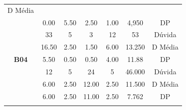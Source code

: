 \begin{table}[htbp]
\begin{tabular}{|ccccccc|}
		D Média \\ \cline{2-7} 
		\rowcolor[HTML]{D9D9D9} 
		\multicolumn{1}{|c|}{\multirow{-3}{*}{\cellcolor[HTML]{F2F2F2}\textbf{B03}}} &
		\multicolumn{1}{c|}{\cellcolor[HTML]{D9D9D9}0.00} &
		\multicolumn{1}{c|}{\cellcolor[HTML]{D9D9D9}5.50} &
		\multicolumn{1}{c|}{\cellcolor[HTML]{D9D9D9}2.50} &
		\multicolumn{1}{c|}{\cellcolor[HTML]{D9D9D9}1.00} &
		\multicolumn{1}{c|}{\cellcolor[HTML]{D9D9D9}4,950} &
		DP \\ \hline
		\multicolumn{1}{|c|}{\cellcolor[HTML]{F2F2F2}} &
		\multicolumn{1}{c|}{33} &
		\multicolumn{1}{c|}{5} &
		\multicolumn{1}{c|}{3} &
		\multicolumn{1}{c|}{12} &
		\multicolumn{1}{c|}{53} &
		Dúvida \\ \cline{2-7} 
		\rowcolor[HTML]{D9D9D9} 
		\multicolumn{1}{|c|}{\cellcolor[HTML]{F2F2F2}} &
		\multicolumn{1}{c|}{\cellcolor[HTML]{D9D9D9}16.50} &
		\multicolumn{1}{c|}{\cellcolor[HTML]{D9D9D9}2.50} &
		\multicolumn{1}{c|}{\cellcolor[HTML]{D9D9D9}1.50} &
		\multicolumn{1}{c|}{\cellcolor[HTML]{D9D9D9}6.00} &
		\multicolumn{1}{c|}{\cellcolor[HTML]{D9D9D9}13.250} &
		D Média \\ \cline{2-7} 
		\multicolumn{1}{|c|}{\multirow{-3}{*}{\cellcolor[HTML]{F2F2F2}\textbf{B04}}} &
		\multicolumn{1}{c|}{5.50} &
		\multicolumn{1}{c|}{0.50} &
		\multicolumn{1}{c|}{0.50} &
		\multicolumn{1}{c|}{4.00} &
		\multicolumn{1}{c|}{11.88} &
		DP \\ \hline
		\rowcolor[HTML]{D9D9D9} 
		\multicolumn{1}{|c|}{\cellcolor[HTML]{F2F2F2}} &
		\multicolumn{1}{c|}{\cellcolor[HTML]{D9D9D9}12} &
		\multicolumn{1}{c|}{\cellcolor[HTML]{D9D9D9}5} &
		\multicolumn{1}{c|}{\cellcolor[HTML]{D9D9D9}24} &
		\multicolumn{1}{c|}{\cellcolor[HTML]{D9D9D9}5} &
		\multicolumn{1}{c|}{\cellcolor[HTML]{D9D9D9}46.000} &
		Dúvida \\ \cline{2-7} 
		\multicolumn{1}{|c|}{\cellcolor[HTML]{F2F2F2}} &
		\multicolumn{1}{c|}{6.00} &
		\multicolumn{1}{c|}{2.50} &
		\multicolumn{1}{c|}{12.00} &
		\multicolumn{1}{c|}{2.50} &
		\multicolumn{1}{c|}{11.500} &
		D Média \\ \cline{2-7} 
		\rowcolor[HTML]{D9D9D9} 
		\multicolumn{1}{|c|}{\multirow{-3}{*}{\cellcolor[HTML]{F2F2F2}\textbf{B05}}} &
		\multicolumn{1}{c|}{\cellcolor[HTML]{D9D9D9}6.00} &
		\multicolumn{1}{c|}{\cellcolor[HTML]{D9D9D9}2.50} &
		\multicolumn{1}{c|}{\cellcolor[HTML]{D9D9D9}11.00} &
		\multicolumn{1}{c|}{\cellcolor[HTML]{D9D9D9}2.50} &
		\multicolumn{1}{c|}{\cellcolor[HTML]{D9D9D9}7.762} &
		DP \\ \hline
		\multicolumn{1}{|c|}{\cellcolor[HTML]{F2F2F2}} &

\end{tabular}
\end{table}
